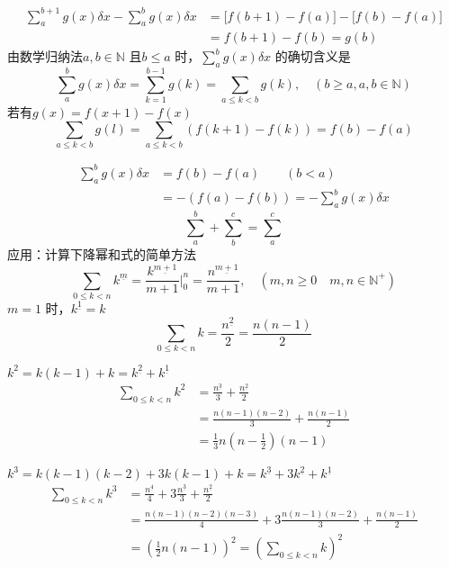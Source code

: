\documentclass[mode=geye]{elegantnote}
\newcommand{\fallingfactorial}[1]{%
  ^{\underline{#1}}%
}
\begin{document}
\begin{align*}
    \sum_{a}^{b+1}g(x) \delta x - \sum_{a}^{b}g(x) \delta x 
    &= \bigl[f(b+1)-f(a)\bigr] - \bigl[f(b)-f(a)\bigr] \\
    &= f(b+1)-f(b) = g(b)
\end{align*}
由数学归纳法$ a, b \in\mathbb{N} $ 且$ b\leqslant a $ 时，$ \sum_{a}^{b}g(x)\delta x $ 的确切含义是
\begin{equation}
    \sum_{a}^{b}g(x) \delta x = \sum_{k=1}^{b-1}g(k) = \sum_{a\leqslant k < b}g(k),\quad (b\geqslant a, a,b\in \mathbb{N})
\end{equation}
若有$ g(x)=f(x+1)-f(x) $ 
\begin{equation*}
    \sum_{a\leqslant k <b}g(l) = \sum_{a\leqslant k<b}(f(k+1)-f(k))=f(b)-f(a)
\end{equation*}

\begin{align*}
    \sum_{a}^{b}g(x)\delta x &= f(b)-f(a)\qquad (b<a) \\
    &= -(f(a)-f(b)) = -\sum_{a}^{b}g(x)\delta x
\end{align*}
\begin{equation*}
    \sum_{a}^{b}+\sum_{b}^{c} = \sum_{a}^{c}
\end{equation*}
应用：计算下降幂和式的简单方法
\begin{equation}
    \sum_{0\leqslant k<n}k\fallingfactorial{m} = \frac{k\fallingfactorial{m+1}}{m+1}\Big|_0^n = \frac{n\fallingfactorial{m+1}}{m+1},\quad \left(m,n\geqslant 0\quad m,n\in\mathbb{N}^+\right)
\end{equation}
$ m=1 $ 时，$ k\fallingfactorial{1}=k $ 
\begin{equation*}
    \sum_{0\leqslant k<n}k = \frac{n\fallingfactorial{2}}{2}=\frac{n(n-1)}{2}
\end{equation*}

$ k^2 = k(k-1)+k=k\fallingfactorial{2}+k\fallingfactorial{1} $ 
\begin{align*}
    \sum_{0\leqslant k<n} k^2
    &=\frac{n\fallingfactorial{3}}{3} + \frac{n\fallingfactorial{2}}{2} \\
    &=\frac{n(n-1)(n-2)}{3}+\frac{n(n-1)}{2} \\
    &=\frac{1}{3}n(n-\frac{1}{2})(n-1)
\end{align*}

$ k^3 = k(k-1)(k-2) +3k(k-1) +k=k\fallingfactorial{3}+3k\fallingfactorial{2}+k\fallingfactorial{1} $ 
\begin{align*}
    \sum_{0\leqslant k<n} k^3
    &=\frac{n\fallingfactorial{4}}{4}
    +3\frac{n\fallingfactorial{3}}{3}
    + \frac{n\fallingfactorial{2}}{2}\\
    &=\frac{n(n-1)(n-2)(n-3)}{4}+3\frac{n(n-1)(n-2)}{3}+\frac{n(n-1)}{2}\\
    &=\left(\frac{1}{2}n(n-1)\right)^2 = \left(\sum_{0\leqslant k<n} k\right)^2
\end{align*}
\end{document}
